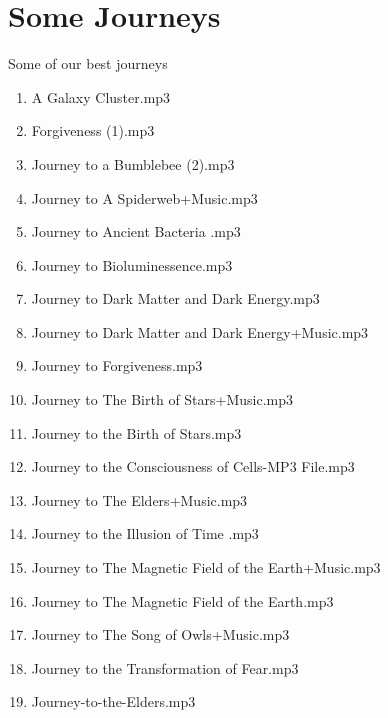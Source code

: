 \documentclass[12pt]{book}
\begin{document}
\appendix

\chapter{Some Journeys}
\label{sec:journeys}

Some of our best journeys
\begin{enumerate}
\item A Galaxy Cluster.mp3
\item Forgiveness (1).mp3
\item Journey to a Bumblebee (2).mp3
\item Journey to A Spiderweb+Music.mp3
\item Journey to Ancient Bacteria .mp3
\item Journey to Bioluminessence.mp3
\item Journey to Dark Matter and Dark Energy.mp3
\item Journey to Dark Matter and Dark Energy+Music.mp3
\item Journey to Forgiveness.mp3
\item Journey to The Birth of Stars+Music.mp3
\item Journey to the Birth of Stars.mp3
\item Journey to the Consciousness of Cells-MP3 File.mp3
\item Journey to The Elders+Music.mp3
\item Journey to the Illusion of Time .mp3
\item Journey to The Magnetic Field of the Earth+Music.mp3
\item Journey to The Magnetic Field of the Earth.mp3
\item Journey to The Song of Owls+Music.mp3
\item Journey to the Transformation of Fear.mp3
\item Journey-to-the-Elders.mp3
\end{enumerate}

  
\end{document}
